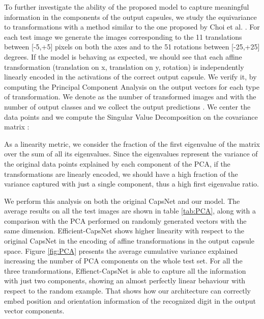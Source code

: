 \documentclass{article}
\begin{document}
To further investigate the ability of the proposed model to capture meaningful information in the components of the output capsules, we study the equivariance to transformations with a method similar to the one proposed by Choi et al. \cite{choi2019attention}. For each test image we generate the images corresponding to the 11 translations between [-5,+5] pixels on both the axes and to the 51 rotations between [-25,+25] degrees. If the model is behaving as expected, we should see that each affine transformation (translation on x, translation on y, rotation) is independently linearly encoded in the activations of the correct output capsule. We verify it, by computing the Principal Component Analysis on the output vectors for each type of transformation.  We denote as  the number of transformed images and with  the number of output classes and we collect the output predictions . We center the data points and we compute the Singular Value Decomposition on the covariance matrix :

\begin{ceqn}

\end{ceqn}

As a linearity metric, we consider the fraction of the first eigenvalue  of the matrix  over the sum of all its eigenvalues. Since the eigenvalues represent the variance of the original data points explained by each component of the PCA, if the transformations are linearly encoded, we should have a high fraction of the variance captured with just a single component, thus a high first eigenvalue ratio.

\begin{ceqn}

\end{ceqn}
We perform this analysis on both the original CapsNet\cite{sabour2017dynamic} and our model. The average results on all the test images are shown in table \ref{tab:PCA}, along with a comparison with the PCA performed on randomly generated vectors with the same dimension. Efficient-CapsNet shows higher linearity with respect to the original CapsNet in the encoding of affine transformations in the output capsule space. Figure \ref{fig:PCA} presents the average cumulative variance explained increasing the number of PCA components on the whole test set. For all the three transformations, Effienct-CapsNet is able to capture all the information with just two components, showing an almost perfectly linear behaviour with respect to the random example. That shows how our architecture can correctly embed position and orientation information of the recognized digit in the output vector components.  
\end{document}
